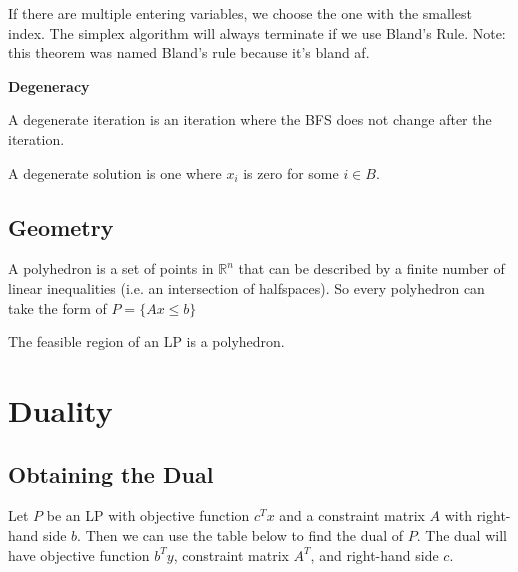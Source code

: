 \documentclass[a4paper]{report}
\begin{document}
\begin{theorem}
  If there are multiple entering variables, we choose the one with the smallest index. The simplex algorithm will always terminate if we use Bland's Rule. Note: this theorem was named Bland's rule because it's bland af.
\end{theorem}

\begin{definition*}
  \textbf{Degeneracy}
\item \begin{definition}\label{degeneracy:i}
  A degenerate iteration is an iteration where the BFS does not change after the iteration.
\end{definition}

\item \begin{definition}\label{degeneracy:ii}
  A degenerate solution is one where $x_i$ is zero for some $i \in B$.
\end{definition}

\end{definition*}

\section{Geometry}
\begin{definition}[Polyhedron]
  A polyhedron is a set of points in $\mathbb R^n$ that can be described by a finite number of linear inequalities (i.e. an intersection of halfspaces). So every polyhedron can take the form of $P = \{Ax \leq b\}$
\end{definition}

\begin{remark}
  The feasible region of an LP is a polyhedron.
\end{remark}

\chapter{Duality}

\section{Obtaining the Dual}
\begin{definition}[Dual of an LP]\label{dual}
  Let $P$ be an LP with objective function $c^Tx$ and a constraint matrix $A$ with right-hand side $b$. Then we can use the table below to find the dual of $P$. The dual will have objective function $b^T y$, constraint matrix $A^T$, and right-hand side $c$.
\end{definition}
\end{document}
